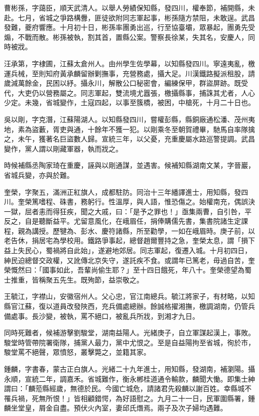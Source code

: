 \begin{pinyinscope}
曹彬孫，字藹臣，順天武清人。以舉人勞績保知縣，發四川，權奉節，補開縣，未赴。七月，省城之爭路構釁，匪徒欲附同志軍起事，彬孫隨方禁阻，未敢逞。武昌發難，夔府響應。十月初十日，彬孫率團勇出巡，行至協臺壩，眾暴起，團勇先受煽，不戰而散。彬孫被執，割其首，置縣公案。警察長徐某，失其名，安慶人，同時被戕。

汪承第，字棣圃，江蘇太倉州人。由州學生佐學幕，以知縣發四川。寧遠夷亂，檄運兵械，至則知府黃承麟留辦剿撫事，充營務處，攝大足。川漢鐵路擬派租股，請歲減萬餘金，民困以紓。攝永川，解散公口秘密會，編練保甲，群盜屏跡。既受代，大吏仍以營務屬之。同志軍起，雙流境尤囂張，檄攝縣事，捕誅其尤者，人心少定。未幾，省城變作，土寇四起，以事至簇橋，被困，中槍死，十月二十日也。

吳以剛，字克潛，江蘇陽湖人。以知縣發四川，嘗權彭縣，縣銅廠通松潘、茂州夷地，素為盜藪，胥吏與通，十餘年不獲一犯。以剛乘冬至朝賀禮畢，馳馬自率隊擒之，未午，獲著名巨盜數人歸。宣統三年，以父憂，充重慶屬水路巡警提調。武昌變作，黨人謂以剛藏軍器，執而戕之。

時候補縣丞陶家琦在重慶，誣與以剛通謀，並遇害。候補知縣湖南文某，字晉巖，省城兵變，亦與於難。

奎榮，字聚五，滿洲正紅旗人，成都駐防。同治十三年繙譯進士，用知縣，發四川。奎榮篤嗜程、硃書，務躬行。性溫厚，與人語，惟恐傷之。始權南充，偶誤決一獄，屈者恚而得狂疾，聞之大戚，曰：「是予之罪也！」亟集兩曹，自引咎，平反之，自是聽斷益平。尤留意風化，在峨眉任，捐俸購儒先書，集書院諸生定課程，親為講授。歷犍為、彭水、慶符諸縣，所至勸學，一如在峨眉時。庚子前，以老告休，捐居宅為學校用。鐵路爭事起，總督趙爾豐持之急，奎榮太息，謂「損下益上失民心，蜀禍將自此始」，遂避地郊居。同志軍起，復遷入城。十月初四日，紳民迫總督交政權，又訛傳北京失守，遂託疾不食。或謂年已篤老，毋過自苦，奎榮慨然曰：「國事如此，吾輩尚偷生耶？」至十四日餓死，年八十。奎榮德望為蜀士推重，皆稱聚五先生。既殉節，益崇敬之。

王毓江，字襟山，安徽宿州人。父心忠，官江南總兵。毓江將家子，有材略，以知縣官江蘇，復以道員改發陜西，充兵備處總辦。餘誠格擢湘撫，檄調湖南，仍管兵備處事。長沙變，被執，罵不絕口，被亂兵所戕，到湘才九日。

同時死難者，候補游擊劉駿堂，湖南益陽人。光緒庚子，自立軍謀起漢上，事敗。駿堂時管帶院署衛隊，捕黨人最力，黨中尤恨之。至是自益陽拘至省城，徇於市，駿堂罵不絕聲，眾憤怒，叢擊斃之，並籍其家。

鍾麟，字書春，蒙古正白旗人。光緒二十九年進士，用知縣，發湖南，補瀏陽。攝永順，宣統二年，調嘉禾。省城難作，衡永郴桂道通令輸款，麟聞大慟。即集士紳謂曰：「麟蒞縣經歲，無德於民。今國亡城危，請諸君先殺麟以謝百姓。幸縣城不罹兵禍，死無所恨！」皆相顧錯愕，為好語慰之。九月二十一日，民軍圍縣署，鍾麟坐堂皇，屑金自盡。預伏火內室，妻邱氏熸焉。兩子及次子婦均遇難。


\end{pinyinscope}

